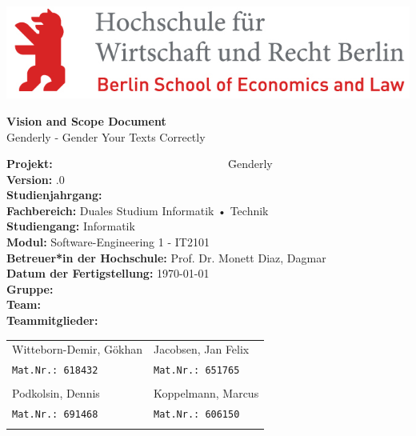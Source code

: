 \hfill
\includegraphics[scale=1]
{Bilder/Logos/HWR_Logo_farbig.jpg}

\begin{center}
	\vspace{1cm}
	\Huge{\textbf{Vision and Scope Document}}\\
	\vspace{1cm}
	\Large{Genderly - Gender Your Texts Correctly}\\
	\vspace{1cm}
\end{center}{\huge \par}

\begin{doublespacing}
	\begin{large}
		\begin{tabbing}
			
			\textbf{Projekt:} ~~~~~~~~~~~~~~~~~~~~~~~~~~~~~~ \= Genderly \\
			\textbf{Version:} .0 \\
			\textbf{Studienjahrgang:} \\
			\textbf{Fachbereich:} \> Duales Studium Informatik • Technik \\
			\textbf{Studiengang:} \> Informatik \\
			\textbf{Modul:}	 \> Software-Engineering 1 - IT2101\\
			\textbf{Betreuer*in der Hochschule:} \> Prof. Dr. Monett Diaz, Dagmar \\
			\textbf{Datum der Fertigstellung:} \> \today \\
			\textbf{Gruppe:} \\
			\textbf{Team:} \\
			\textbf{Teammitglieder:} \>  \\
			
		\end{tabbing}
	\end{large}
\end{doublespacing}


	\vspace{-1cm}
	\begin{tabular}{ll}
		\large{Witteborn-Demir, Gökhan}  &  \large{Jacobsen, Jan Felix}\\
		\texttt{Mat.Nr.: 618432}    	 &  \texttt{Mat.Nr.: 651765}\\
		& \\
		\large{Podkolsin, Dennis}   	 &  \large{Koppelmann, Marcus}\\
		\texttt{Mat.Nr.: 691468}    	 &  \texttt{Mat.Nr.: 606150}\\
		& \\
	\end{tabular}

	
	\pagebreak
	
